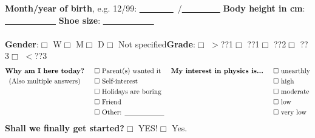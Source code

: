 \textbf{Month/year of birth}, \textsf{e.g. 12/99}: \underline{~~~~~~~~}~/\underline{~~~~~~~~~}\hspace{1cm} \textbf{Body height in cm}: \underline{~~~~~~~~~~~~}\hspace{1cm} \textbf{Shoe size}: \underline{~~~~~~~~~~~~} \\ 
\vspace{0.2cm}\\
\textbf{Gender}:\hspace{0.4cm}$\Box$ W\hspace{0.5cm}$\Box$ M\hspace{0.5cm}$\Box$ D\hspace{0.5cm}$\Box$ Not specified\hspace{1cm}\textbf{Grade}:\hspace{0.5cm}$\Box$ $>$??1\hspace{0.5cm}$\Box$ ??1\hspace{0.5cm}$\Box$ ??2\hspace{0.5cm}$\Box$ ??3\hspace{0.5cm}$\Box$ $<$??3 \\
\begin{align*}
\textmd{\textbf{Why am I here today?}}   \hspace{0.5cm}& \Box \textmd{ Parent(s) wanted it} &\textmd{\textbf{My interest in physics is...}}  \hspace{0.5cm}& \Box \textmd{ unearthly}\\
\textmd{(Also multiple answers)}   \hspace{0.7cm}&\Box \textmd{ Self-interest} && \Box \textmd{ high}\\
    &\Box \textmd{ Holidays are boring} && \Box \textmd{ moderate}\\
    &\Box \textmd{ Friend} && \Box \textmd{ low}\\
    &\Box \textmd{ Other: \underline{\hspace{2cm}}} && \Box \textmd{ very low}
\end{align*}
\textbf{Shall we finally get started?}\hspace{0.5cm}$\Box$ YES!\hspace{0.5cm}$\Box$ Yes. \newline
